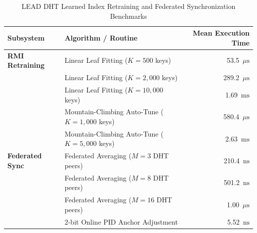 \begin{table}[t]
\centering
\caption{LEAD DHT Learned Index Retraining and Federated Synchronization Benchmarks}
\label{tab:rmi_training_sync}
\begin{tabular}{llr}
\hline
\textbf{Subsystem} & \textbf{Algorithm / Routine} & \textbf{Mean Execution Time} \\
\hline
\textbf{RMI Retraining} & Linear Leaf Fitting ($K=500$ keys) & 53.5~$\mu\text{s}$ \\
& Linear Leaf Fitting ($K=2{,}000$ keys) & 289.2~$\mu\text{s}$ \\
& Linear Leaf Fitting ($K=10{,}000$ keys) & 1.69~$\text{ms}$ \\
& Mountain-Climbing Auto-Tune ($K=1{,}000$ keys) & 580.4~$\mu\text{s}$ \\
& Mountain-Climbing Auto-Tune ($K=5{,}000$ keys) & 2.63~$\text{ms}$ \\
\hline
\textbf{Federated Sync} & Federated Averaging ($M=3$ DHT peers) & 210.4~$\text{ns}$ \\
& Federated Averaging ($M=8$ DHT peers) & 501.2~$\text{ns}$ \\
& Federated Averaging ($M=16$ DHT peers) & 1.00~$\mu\text{s}$ \\
& 2-bit Online PID Anchor Adjustment & 5.52~$\text{ns}$ \\
\hline
\end{tabular}
\end{table}
